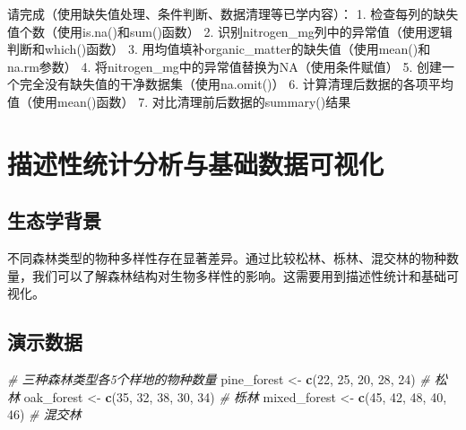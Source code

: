 \documentclass[
]{book}
\newenvironment{Shaded}{\begin{snugshade}}{\end{snugshade}}
\newcommand{\CommentTok}[1]{\textcolor[rgb]{0.56,0.35,0.01}{\textit{#1}}}
\newcommand{\DecValTok}[1]{\textcolor[rgb]{0.00,0.00,0.81}{#1}}
\newcommand{\FunctionTok}[1]{\textcolor[rgb]{0.13,0.29,0.53}{\textbf{#1}}}
\newcommand{\NormalTok}[1]{#1}
\newcommand{\OtherTok}[1]{\textcolor[rgb]{0.56,0.35,0.01}{#1}}
\begin{document}
请完成（使用缺失值处理、条件判断、数据清理等已学内容）：
1. 检查每列的缺失值个数（使用is.na()和sum()函数）
2. 识别nitrogen\_mg列中的异常值（使用逻辑判断和which()函数）
3. 用均值填补organic\_matter的缺失值（使用mean()和na.rm参数）
4. 将nitrogen\_mg中的异常值替换为NA（使用条件赋值）
5. 创建一个完全没有缺失值的干净数据集（使用na.omit()）
6. 计算清理后数据的各项平均值（使用mean()函数）
7. 对比清理前后数据的summary()结果

\hypertarget{ux63cfux8ff0ux6027ux7edfux8ba1ux5206ux6790ux4e0eux57faux7840ux6570ux636eux53efux89c6ux5316}{%
\section{描述性统计分析与基础数据可视化}\label{ux63cfux8ff0ux6027ux7edfux8ba1ux5206ux6790ux4e0eux57faux7840ux6570ux636eux53efux89c6ux5316}}

\hypertarget{ux751fux6001ux5b66ux80ccux666f-6}{%
\subsection{生态学背景}\label{ux751fux6001ux5b66ux80ccux666f-6}}

不同森林类型的物种多样性存在显著差异。通过比较松林、栎林、混交林的物种数量，我们可以了解森林结构对生物多样性的影响。这需要用到描述性统计和基础可视化。

\hypertarget{ux6f14ux793aux6570ux636e-5}{%
\subsection{演示数据}\label{ux6f14ux793aux6570ux636e-5}}

\begin{Shaded}
\begin{Highlighting}[]
\CommentTok{\# 三种森林类型各5个样地的物种数量}
\NormalTok{pine\_forest }\OtherTok{\textless{}{-}} \FunctionTok{c}\NormalTok{(}\DecValTok{22}\NormalTok{, }\DecValTok{25}\NormalTok{, }\DecValTok{20}\NormalTok{, }\DecValTok{28}\NormalTok{, }\DecValTok{24}\NormalTok{)      }\CommentTok{\# 松林}
\NormalTok{oak\_forest }\OtherTok{\textless{}{-}} \FunctionTok{c}\NormalTok{(}\DecValTok{35}\NormalTok{, }\DecValTok{32}\NormalTok{, }\DecValTok{38}\NormalTok{, }\DecValTok{30}\NormalTok{, }\DecValTok{34}\NormalTok{)       }\CommentTok{\# 栎林  }
\NormalTok{mixed\_forest }\OtherTok{\textless{}{-}} \FunctionTok{c}\NormalTok{(}\DecValTok{45}\NormalTok{, }\DecValTok{42}\NormalTok{, }\DecValTok{48}\NormalTok{, }\DecValTok{40}\NormalTok{, }\DecValTok{46}\NormalTok{)     }\CommentTok{\# 混交林}
\end{Highlighting}
\end{Shaded}
\end{document}
